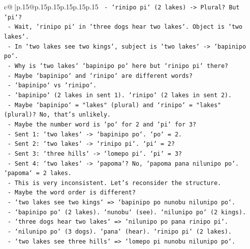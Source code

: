 \documentclass{article}
\begin{document}
{\begin{supertabular}{c@{$\;$}|p{.15\linewidth}@{}p{.15\linewidth}p{.15\linewidth}p{.15\linewidth}p{.15\linewidth}p{.15\linewidth}}
{{{\texttt{                     {-} `rinipo pi` (2 lakes) {-}> Plural? But `pi`?} \\
\texttt{                     {-} Wait, `rinipo pi` in `three dogs hear two lakes`. Object is `two lakes`.} \\
\texttt{                     {-} In `two lakes see two kings`, subject is `two lakes` {-}> `bapinipo po`.} \\
\texttt{                     {-} Why is `two lakes` `bapinipo po` here but `rinipo pi` there?} \\
\texttt{                     {-} Maybe `bapinipo` and `rinipo` are different words?} \\
\texttt{                     {-} `bapinipo` vs `rinipo`.} \\
\texttt{                     {-} `bapinipo` (2 lakes in sent 1). `rinipo` (2 lakes in sent 2).} \\
\texttt{                     {-} Maybe `bapinipo` = "lakes" (plural) and `rinipo` = "lakes" (plural)? No, that's unlikely.} \\
\texttt{                     {-} Maybe the number word is `po` for 2 and `pi` for 3?} \\
\texttt{                     {-} Sent 1: `two lakes` {-}> `bapinipo po`. `po` = 2.} \\
\texttt{                     {-} Sent 2: `two lakes` {-}> `rinipo pi`. `pi` = 2?} \\
\texttt{                     {-} Sent 3: `three hills` {-}> `lomepo pi`. `pi` = 3?} \\
\texttt{                     {-} Sent 4: `two lakes` {-}> `papoma`? No, `papoma pana nilunipo po`. `papoma` = 2 lakes.} \\
\texttt{                     {-} This is very inconsistent. Let's reconsider the structure.} \\
\texttt{                     {-} Maybe the word order is different?} \\
\texttt{                     {-} `two lakes see two kings` => `bapinipo po nunobu nilunipo po`.} \\
\texttt{                       {-} `bapinipo po` (2 lakes). `nunobu` (see). `nilunipo po` (2 kings).} \\
\texttt{                     {-} `three dogs hear two lakes` => `nilunipo po pana rinipo pi`.} \\
\texttt{                       {-} `nilunipo po` (3 dogs). `pana` (hear). `rinipo pi` (2 lakes).} \\
\texttt{                     {-} `two lakes see three hills` => `lomepo pi nunobu nilunipo po`.} \\
}}}
\end{supertabular}}
\end{document}
